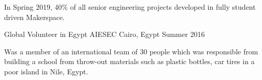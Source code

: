 \begin{cventries}
{\begin{cvitems}
        \item {In Spring 2019, 40\% of all senior engineering projects developed in fully student driven Makerspace.}
     \end{cvitems}
    }
  \cvopenentry
    {Global Volunteer in Egypt } %
    {AIESEC} %
    {Cairo, Egypt} %
    {Summer 2016} %
    {
      \begin{cvitems} %
        \item {Was a member of an international team of 30 people which was responsible from building a school from throw-out materials such as plastic bottles, car tires in a poor island in Nile, Egypt. }
      \end{cvitems}
    }


\begin{comment}
Commented code
  \cventry
    {Reviewer and Participant} %
    {Algorithm Competition Programme} %
    {Inzva, Istanbul} %
    {Oct. 2018 - May. 2019} %
    {
      \begin{cvitems} %
        \item {Participated in the 30-week Algorithm Competition Programme which includes lectures, contests, and a variety of practises.}
      \end{cvitems}
    }
    \vspace{2mm}
\cventry
    {Member} %
    {Association for Computing Machinery Society} %
    {Koc Universtiy} %
    {Oct. 2017 - Present} %
    {
      \begin{cvitems} %
        \item {Responsible for organizing IoT and robotics related workshops, conferences for new members. }
        \item {Developing tech-projects to attend national and international competitions. }
      \end{cvitems}
    }


\end{comment}
\end{cventries}
